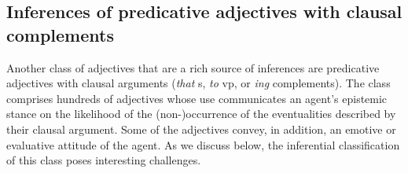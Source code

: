 \documentclass[10pt]{article}
\begin{document}
 



\subsection{Inferences of predicative adjectives with clausal complements}

Another class of adjectives that are a rich source of inferences are predicative adjectives with clausal arguments (\emph{that} {\sc s}, \emph{to} {\sc vp}, or \emph{ing} complements). The class comprises hundreds of adjectives whose use communicates an agent's epistemic stance on the likelihood of the (non-)occurrence of the eventualities described by their clausal argument. Some of the adjectives convey, in addition, an emotive or evaluative attitude of the agent. As we discuss below, the inferential classification of this class poses interesting challenges.
\end{document}
